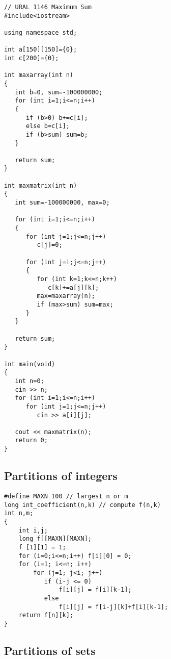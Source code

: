 \documentclass[a4paper]{article}
\begin{document}
\begin{verbatim}
// URAL 1146 Maximum Sum
#include<iostream>

using namespace std;

int a[150][150]={0};
int c[200]={0};

int maxarray(int n)
{
   int b=0, sum=-100000000;
   for (int i=1;i<=n;i++)
   {
      if (b>0) b+=c[i];
      else b=c[i];
      if (b>sum) sum=b;
   }
   
   return sum;
}

int maxmatrix(int n)
{
   int sum=-100000000, max=0;
   
   for (int i=1;i<=n;i++)
   {
      for (int j=1;j<=n;j++)
         c[j]=0;
      
      for (int j=i;j<=n;j++)
      {
         for (int k=1;k<=n;k++)
            c[k]+=a[j][k];
         max=maxarray(n);
         if (max>sum) sum=max;
      }
   }
   
   return sum;
}

int main(void)
{
   int n=0;
   cin >> n;
   for (int i=1;i<=n;i++)
      for (int j=1;j<=n;j++)
         cin >> a[i][j];
   
   cout << maxmatrix(n);
   return 0;
}
\end{verbatim}

\subsection{Partitions of integers}

\begin{verbatim}
#define MAXN 100 // largest n or m
long int_coefficient(n,k) // compute f(n,k)
int n,m;
{
    int i,j;
    long f[[MAXN][MAXN];
    f [1][1] = 1;
    for (i=0;i<=n;i++) f[i][0] = 0;
    for (i=1; i<=n; i++)
        for (j=1; j<i; j++)
           if (i-j <= 0)
               f[i][j] = f[i][k-1];
           else
               f[i][j] = f[i-j][k]+f[i][k-1];
    return f[n][k];
}
\end{verbatim}

\subsection{Partitions of sets}
\end{document}
